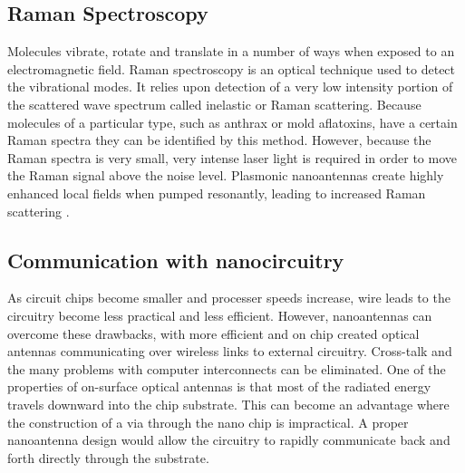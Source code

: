 \documentclass[11pt]{article}
\begin{document}
\subsection{Raman Spectroscopy}
%
Molecules vibrate, rotate and translate in a number of ways when exposed to an electromagnetic field. Raman spectroscopy is an optical technique used to detect the vibrational modes. It relies upon detection of a very low intensity portion of the scattered wave spectrum called inelastic or Raman scattering. Because molecules of a particular type, such as anthrax or mold aflatoxins, have a certain Raman spectra they can be identified by this method. However, because the Raman spectra is very small, very intense laser light is required in order to move the Raman signal above the noise level. Plasmonic nanoantennas create highly enhanced local fields when pumped resonantly, leading to increased Raman scattering \cite{Felidj2003}.
\subsection{Communication with nanocircuitry}
%
As circuit chips become smaller and processer speeds increase, wire leads to the circuitry become less practical and less efficient. However, nanoantennas can overcome these drawbacks, with more efficient and on chip created optical antennas communicating over wireless links to external circuitry. Cross-talk and the many problems with computer interconnects can be eliminated. One of the properties of on-surface optical antennas is that most of the radiated energy travels downward into the chip substrate. This can become an advantage where the construction of a via through the nano chip is impractical.  A proper nanoantenna design would allow the circuitry to rapidly communicate back and forth directly through the substrate.
\end{document}
